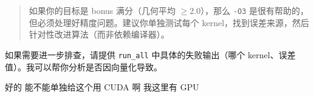 \documentclass[11pt, a4paper]{article}
\begin{document}
\begin{aibox}
\begin{quote}
如果你的目标是 bonus 满分（几何平均 $\ge 2.0$），那么 \texttt{-O3} 是很有帮助的，但必须处理好精度问题。建议你单独测试每个 kernel，找到误差来源，然后针对性改进算法（而非依赖编译器）。
\end{quote}

如果需要进一步排查，请提供 \texttt{run\_all} 中具体的失败输出（哪个 kernel、误差值）。我可以帮你分析是否因向量化导致。
\end{aibox}

\vspace{1.5em}

\begin{userbox}
好的 能不能单独给这个用 CUDA 啊 我这里有 GPU
\end{userbox}
\end{document}
